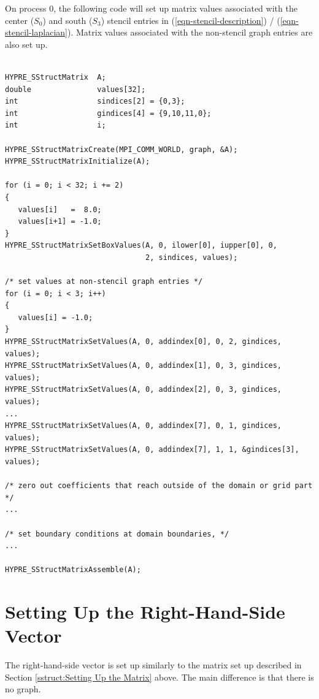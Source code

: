 On process 0, the following code will set up matrix values associated
with the center ($S_0$) and south ($S_3$) stencil entries in
(\ref{eqn-stencil-description}) / (\ref{eqn-stencil-laplacian}).
Matrix values associated with the non-stencil graph entries are also
set up.
\begin{display}
\begin{verbatim}

HYPRE_SStructMatrix  A;
double               values[32];
int                  sindices[2] = {0,3};
int                  gindices[4] = {9,10,11,0};
int                  i;

HYPRE_SStructMatrixCreate(MPI_COMM_WORLD, graph, &A);
HYPRE_SStructMatrixInitialize(A);

for (i = 0; i < 32; i += 2)
{
   values[i]   =  8.0;
   values[i+1] = -1.0;
}
HYPRE_SStructMatrixSetBoxValues(A, 0, ilower[0], iupper[0], 0,
                                2, sindices, values);

/* set values at non-stencil graph entries */
for (i = 0; i < 3; i++)
{
   values[i] = -1.0;
}
HYPRE_SStructMatrixSetValues(A, 0, addindex[0], 0, 2, gindices, values);
HYPRE_SStructMatrixSetValues(A, 0, addindex[1], 0, 3, gindices, values);
HYPRE_SStructMatrixSetValues(A, 0, addindex[2], 0, 3, gindices, values);
...
HYPRE_SStructMatrixSetValues(A, 0, addindex[7], 0, 1, gindices, values);
HYPRE_SStructMatrixSetValues(A, 0, addindex[7], 1, 1, &gindices[3], values);

/* zero out coefficients that reach outside of the domain or grid part */
...

/* set boundary conditions at domain boundaries, */
...

HYPRE_SStructMatrixAssemble(A);

\end{verbatim}
\end{display}


\section{Setting Up the Right-Hand-Side Vector}
\label{sstruct:Setting Up the Right-Hand-Side Vector}

The right-hand-side vector is set up similarly to the matrix set up
described in Section \ref{sstruct:Setting Up the Matrix} above.  The
main difference is that there is no graph.


